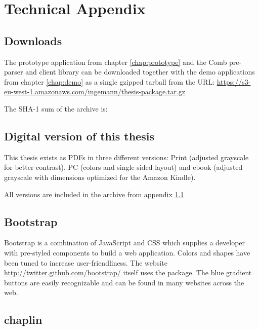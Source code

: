 \documentclass[thesis.tex]{subfiles}
\begin{document}
\chapter{Technical Appendix}

\section{Downloads}
\label{app:downloads}
The prototype application from chapter \ref{chap:prototype} and the Comb
pre-parser and client library can be downloaded together with
the demo applications from chapter \ref{chap:demo} as a single gzipped tarball
from the URL: \url{https://s3-eu-west-1.amazonaws.com/ingemann/thesis-package.tar.gz}

The SHA-1 sum of the archive is: 


\section{Digital version of this thesis}
This thesis exists as PDFs in three different versions:
Print (adjusted grayscale for better contrast),
PC (colors and single sided layout) and
ebook (adjusted grayscale with dimensions optimized for the Amazon Kindle).

All versions are included in the archive from appendix \ref{app:downloads}

\section{Bootstrap}
\label{app:bootstrap}
Bootstrap is a combination of JavaScript and CSS which supplies a developer
with pre-styled components to build a web application. Colors and shapes
have been tuned to increase user-friendliness.
The website \url{http://twitter.github.com/bootstrap/} itself uses the package.
The blue gradient buttons are easily recognizable and can be found in many
websites across the web.

\section{chaplin}
\label{app:chaplin}
\end{document}
